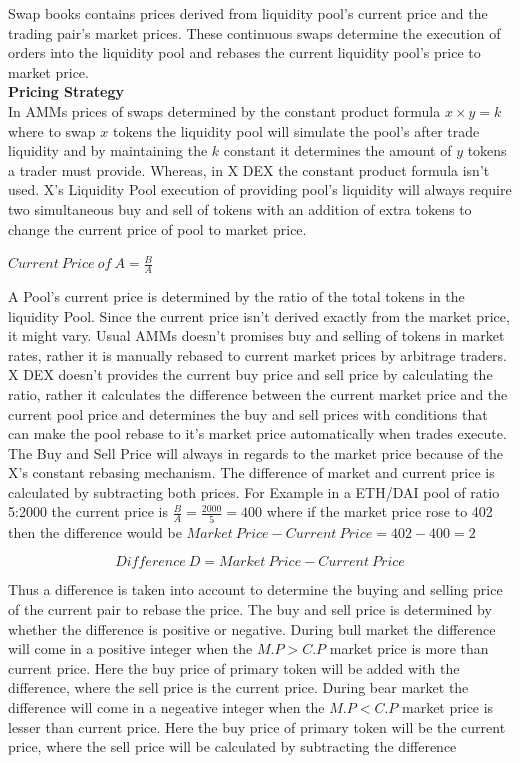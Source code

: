\documentclass[letterpaper,11pt]{article}
\begin{document}
Swap books contains prices derived from liquidity pool's current price and the trading pair's market prices. These continuous swaps determine the execution of orders into the liquidity pool and rebases the current liquidity pool's price to market price.\\

\textbf{Pricing Strategy}\\

In AMMs prices of swaps determined by the constant product formula $x \times  y=k$ where to swap $x$ tokens the liquidity pool will simulate the pool's after trade liquidity and by maintaining the $k$ constant it determines the amount of $y$ tokens a trader must provide. Whereas, in X DEX the constant product formula isn't used. X's Liquidity Pool execution of providing pool's liquidity will always require two simultaneous buy and sell of tokens with an addition of extra tokens to change the current price of pool to market price.


\begin{center}
$Current\:Price\:of\:A = \frac{B}{A}$
\end{center}

A Pool's current price is determined by the ratio of the total tokens in the liquidity Pool. Since the current price isn't derived exactly from the market price, it might vary. Usual AMMs doesn't promises buy and selling of tokens in market rates, rather it is manually rebased to current market prices by arbitrage traders. X DEX doesn't provides the current buy price and sell price by calculating the ratio, rather it calculates the difference between the current market price and the current pool price and determines the buy and sell prices with conditions that can make the pool rebase to it's market price automatically when trades execute.\\

The Buy and Sell Price will always in regards to the market price because of the X's constant rebasing mechanism. The difference of market and current price is calculated by subtracting both prices. For Example in a ETH/DAI pool of ratio 5:2000 the current price is $\frac{B}{A}=\frac{2000}{5}=400$ where if the market price rose to 402 then the difference would be $Market\:Price - Current\:Price=402-400=2$

\[Difference\:D = Market\:Price - Current\:Price\]



Thus a difference is taken into account to determine the buying and selling price of the current pair to rebase the price. The buy and sell price is determined by whether the difference is positive or negative. During bull market the difference will come in a positive integer when the $M.P>C.P$ market price is more than current price. Here the buy price of primary token will be added with the difference, where the sell price is the current price. During bear market the difference will come in a negeative integer when the $M.P<C.P$ market price is lesser than current price. Here the buy price of primary token will be the current price, where the sell price will be calculated by subtracting the difference\\
\end{document}
